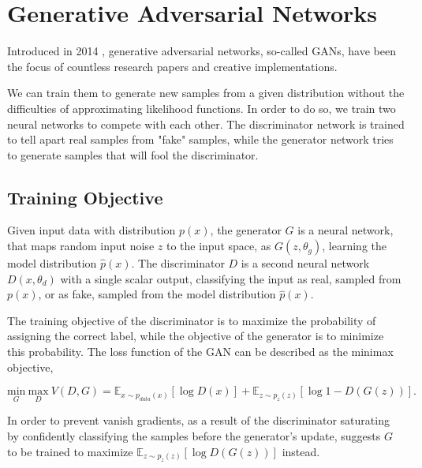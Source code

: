 \documentclass{article}
\begin{document}
\section{Generative Adversarial Networks}


Introduced in 2014 \cite{goodfellow_generative_2014}, generative adversarial  networks, so-called GANs, have been the focus of countless research papers and creative implementations.

We can train them to generate new samples from a given distribution without the difficulties of approximating likelihood functions. In order to do so, we train two neural networks to compete with each other. The discriminator network is trained to tell apart real samples from "fake" samples, while the generator network tries to generate samples that will fool the discriminator.

\subsection{Training Objective} \label{sec:GAN_training}
Given input data with distribution $p(x)$, the generator $G$ is a neural network, that maps random input noise $z$ to the input space, as $G(z, \theta_{g})$, learning the model distribution $\hat{p}(x)$. The discriminator $D$ is a second neural network $D(x, \theta_{d})$ with a single scalar output, classifying the input as real, sampled from $p(x)$, or as fake, sampled from the model distribution $\hat{p}(x)$. 

The training objective of the discriminator is to maximize the probability of assigning the correct label, while the objective of the generator is to minimize this probability. The loss function of the GAN can be described as the minimax objective,

\begin{equation}
\underset{G}{\mathrm{min}} \ \underset{D}{\mathrm{max}} \ V(D,G) = \mathbb{E}_{x \sim p_{data}(x)}[\log D(x)] + \mathbb{E}_{z \sim p_{z}(z)}[\log 1 - D(G(z))].
\label{eq:minimax}
\end{equation}

In order to prevent vanish gradients, as a result of the discriminator saturating by confidently classifying the samples before the generator's update, \cite{goodfellow_generative_2014} suggests $G$ to be trained to maximize $\mathbb{E}_{z \sim p_{z}(z)}[\log D(G(z))]$ instead.
\end{document}
